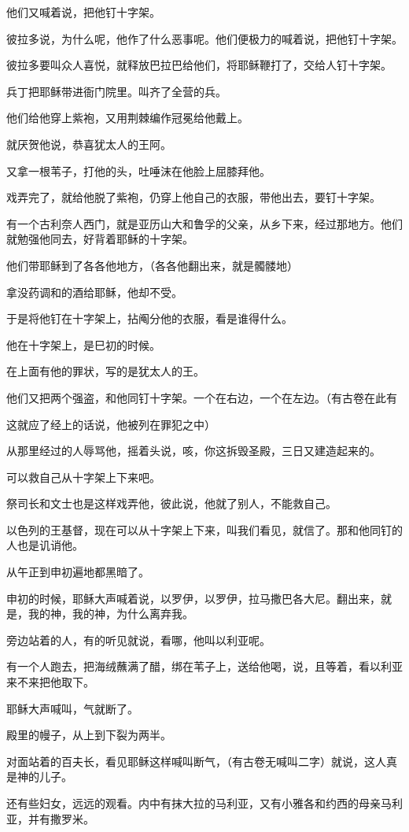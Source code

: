 \documentclass[12pt,oneside]{book}
\begin{document}
他们又喊着说，把他钉十字架。

彼拉多说，为什么呢，他作了什么恶事呢。他们便极力的喊着说，把他钉十字架。

彼拉多要叫众人喜悦，就释放巴拉巴给他们，将耶稣鞭打了，交给人钉十字架。

兵丁把耶稣带进衙门院里。叫齐了全营的兵。

他们给他穿上紫袍，又用荆棘编作冠冕给他戴上。

就厌贺他说，恭喜犹太人的王阿。

又拿一根苇子，打他的头，吐唾沫在他脸上屈膝拜他。

戏弄完了，就给他脱了紫袍，仍穿上他自己的衣服，带他出去，要钉十字架。

有一个古利奈人西门，就是亚历山大和鲁孚的父亲，从乡下来，经过那地方。他们就勉强他同去，好背着耶稣的十字架。

他们带耶稣到了各各他地方，（各各他翻出来，就是髑髅地）

拿没药调和的酒给耶稣，他却不受。

于是将他钉在十字架上，拈阄分他的衣服，看是谁得什么。

他在十字架上，是巳初的时候。

在上面有他的罪状，写的是犹太人的王。

他们又把两个强盗，和他同钉十字架。一个在右边，一个在左边。（有古卷在此有

这就应了经上的话说，他被列在罪犯之中）

从那里经过的人辱骂他，摇着头说，咳，你这拆毁圣殿，三日又建造起来的。

可以救自己从十字架上下来吧。

祭司长和文士也是这样戏弄他，彼此说，他就了别人，不能救自己。

以色列的王基督，现在可以从十字架上下来，叫我们看见，就信了。那和他同钉的人也是讥诮他。

从午正到申初遍地都黑暗了。

申初的时候，耶稣大声喊着说，以罗伊，以罗伊，拉马撒巴各大尼。翻出来，就是，我的神，我的神，为什么离弃我。

旁边站着的人，有的听见就说，看哪，他叫以利亚呢。

有一个人跑去，把海绒蘸满了醋，绑在苇子上，送给他喝，说，且等着，看以利亚来不来把他取下。

耶稣大声喊叫，气就断了。

殿里的幔子，从上到下裂为两半。

对面站着的百夫长，看见耶稣这样喊叫断气，（有古卷无喊叫二字）就说，这人真是神的儿子。

还有些妇女，远远的观看。内中有抹大拉的马利亚，又有小雅各和约西的母亲马利亚，并有撒罗米。
\end{document}
